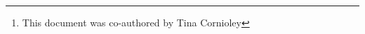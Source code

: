 
\author{Timoth\'ee Bonnet \&\footnote{This document was co-authored by Tina Cornioley}\; Koen van Benthem\\\\
\tt{timothee.bonnet@ieu.uzh.ch}\\ \tt{koen.vanbenthem@ieu.uzh.ch}}

\date{Spring 2016}

